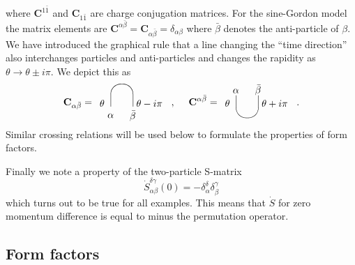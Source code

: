 \documentclass[a4paper,a4paper]{article}
\begin{document}
where $\mathbf{C}^{1\bar{1}}$ and $\mathbf{C}_{1\bar{1}}$ are charge
conjugation matrices. For the sine-Gordon model the matrix elements are $%
\mathbf{C}^{\alpha \bar{\beta}}=\mathbf{C}_{\alpha \bar{\beta}}=\delta
_{\alpha \beta }$ where $\bar{\beta}$ denotes the anti-particle of $\beta $.
We have introduced the graphical rule that a line changing the ``time
direction'' also interchanges particles and anti-particles and changes the
rapidity as $\theta \to \theta \pm i\pi $. We depict this as 
\[
\mathbf{C}_{\alpha \bar{\beta}}= 
\begin{array}{c}
\unitlength4mm\begin{picture}(6,3) \put(2,1){\oval(2,4)[t]}
\put(0,1){$\theta$} \put(3.3,1){$\theta-i\pi$} \put(.7,0){$\alpha$}
\put(2.7,-.1){$\bar\beta$} \end{picture}
\end{array}
,~~~~\mathbf{C}^{\alpha \bar{\beta}}= 
\begin{array}{c}
\unitlength4mm\begin{picture}(6,3) \put(2,2){\oval(2,4)[b]}
\put(0,1){$\theta$} \put(3.3,1){$\theta+i\pi$} \put(.7,2.2){$\alpha$}
\put(2.7,2.2){$\bar\beta$} \end{picture}
\end{array}
. 
\]
Similar crossing relations will be used below to formulate the properties of
form factors.

Finally we note a property of the two-particle S-matrix 
\begin{equation}
\dot{S}_{\alpha \beta }^{\delta \gamma }(0)=-\delta _{\alpha }^{\delta
}\delta _{\beta }^{\gamma }  \label{1.10}
\end{equation}
which turns out to be true for all examples. This means that $\dot{S}$ for
zero momentum difference is equal to minus the permutation operator.

\subsection{Form factors}
\end{document}
